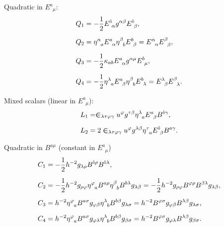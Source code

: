 \documentclass[
10pt, %
a4paper, %
oneside, %
headinclude,footinclude, %
BCOR5mm, %
]{scrartcl}
\newcommand{\mg}[1]{\kappa_{#1}}			%
\newcommand{\itetrsymbol}{\eta}
\newcommand{\itetr}[2]{\itetrsymbol^{#1}_{\phantom{#1}#2}}
\newcommand{\ET}[2]{E^{#1}_{\phantom{#1}#2}}	%
\newcommand{\BT}[2]{B^{#1#2}}	%
\newcommand{\LCsymb}{\bm{\in}}    %
\newcommand{\indalg}[1]{\hat{\mathsmaller{#1}}}
\begin{document}
Quadratic in $ \ET{a}{\mu} $:
\begin{align}\label{eqn.tors.scal2.Q}
	Q_1 &= -\frac12 \ET{\indalg{0}}{\alpha} g^{\alpha\beta} \ET{\indalg{0}}{\beta},\\[2mm]
	Q_2 &= \itetr{\alpha}{a} \ET{a}{\alpha} \itetr{\beta}{b} \ET{b}{\beta} = 
	\ET{\alpha}{\alpha} \ET{\beta}{\beta},\\[2mm]
	Q_3 &=-\frac12 \mg{ab} \ET{a}{\alpha} g^{\alpha\mu}
	\ET{b}{\mu},\\[2mm]
	Q_4 &=-\frac12 \itetr{\lambda}{a} \ET{a}{\beta} \itetr{\beta}{b} \ET{b}{\lambda} = 
	\ET{\lambda}{\beta} \ET{\beta}{\lambda}.
\end{align}

Mixed scalars (linear in $ \ET{a}{\mu} $):
\begin{align}\label{eqb.ts.scal.L}
	L_1 &= \LCsymb_{\lambda\tau\varphi\gamma} u^\varphi g^{\tau\beta} \itetr{\lambda}{a} 
	\ET{a}{\beta} \BT{\indalg{0}}{\gamma},\\[2mm]
	L_2 &= 2 \LCsymb_{\lambda\tau\varphi\gamma} u^\varphi g^{\lambda\beta} \itetr{\tau}{a} 
	\ET{\indalg{0}}{\beta} \BT{a}{\gamma}.
\end{align}

Quadratic in $ \BT{a}{\mu} $ (constant in  $ \ET{a}{\mu} $)
\begin{align}\label{eqn.tors.scal.C}
	C_1 &=-\frac12 h^{-2} g_{\lambda\rho} \BT{\indalg{0}}{\rho} \BT{\indalg{0}}{\lambda},\\[2mm]
	C_2 &=-\frac12 h^{-2} g_{\rho\varphi} \itetr{\varphi}{a} \BT{a}{\rho} \itetr{\beta}{b} 
	\BT{b}{\lambda}g_{\lambda\beta} = -\frac12 h^{-2} g_{\rho\varphi} \BT{\varphi}{\rho} 
	\BT{\beta}{\lambda}g_{\lambda\beta},\\[2mm]
	C_3 &= h^{-2} \itetr{\varphi}{a} \BT{a}{\sigma} g_{\varphi\beta} \itetr{\lambda}{b} 
	\BT{b}{\beta} g_{\lambda\sigma} = h^{-2} \BT{\varphi}{\sigma} g_{\varphi\beta} 
	\BT{\lambda}{\beta} g_{\lambda\sigma},\\[2mm]
	C_4 &= h^{-2} \itetr{\varphi}{a} \BT{a}{\sigma} g_{\varphi\lambda} \itetr{\lambda}{b} 
	\BT{b}{\beta} g_{\beta\sigma} =h^{-2} \BT{\varphi}{\sigma} g_{\varphi\lambda} 
	\BT{\lambda}{\beta} g_{\beta\sigma}.
\end{align}
\end{document}
